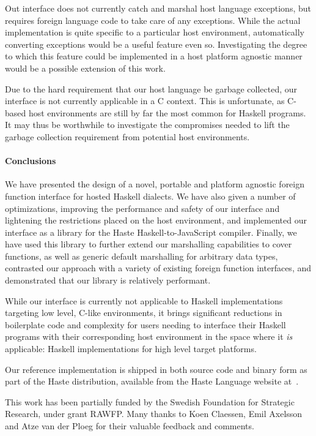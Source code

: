 \documentclass[preprint]{sigplanconf}
\begin{document}
Out interface does not currently catch and marshal host language
exceptions, but requires foreign language code to take care of any exceptions.
While the actual implementation is quite specific to a particular
host environment, automatically converting exceptions would be a useful feature
even so. Investigating the degree to which this feature could be implemented
in a host platform agnostic manner would be a possible extension of this work.

Due to the hard requirement that our host language be garbage collected,
our interface is not currently applicable in a C context. This is unfortunate,
as C-based host environments are still by far the most common for Haskell
programs. It may thus be worthwhile to investigate the compromises needed
to lift the garbage collection requirement from potential host environments.

\paragraph{Conclusions}
We have presented the design of a novel, portable and platform agnostic foreign
function interface for hosted Haskell dialects. We have also given a number of
optimizations, improving the performance and safety of our interface
and lightening the restrictions placed on the host environment, and implemented
our interface as a library for the Haste Haskell-to-JavaScript compiler.
Finally, we have used this library to further extend our marshalling
capabilities to cover functions, as well as generic default marshalling for
arbitrary data types, contrasted our approach with a variety of existing
foreign function interfaces, and demonstrated that our library is relatively
performant.

While our interface is currently not applicable to Haskell implementations
targeting low level, C-like environments, it brings significant reductions in
boilerplate code and complexity for users needing to interface their Haskell
programs with their corresponding host environment in the space where it
\emph{is} applicable: Haskell implementations for high level target platforms.

Our reference implementation is shipped in both source code and binary form as
part of the Haste distribution, available from the Haste Language website
at\ \cite{haste-lang.org}.

\acks
This work has been partially funded by the Swedish Foundation for Strategic Research, under grant RAWFP. Many thanks to Koen Claessen, Emil Axelsson and Atze van der Ploeg for their valuable feedback and comments.
\end{document}
